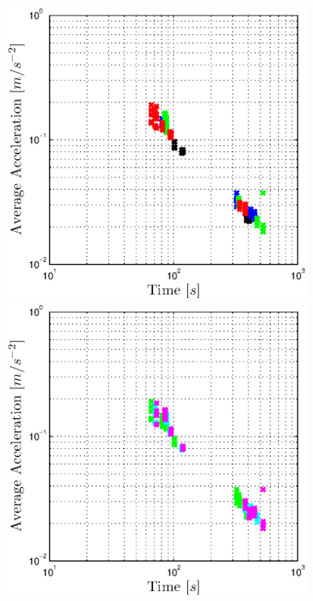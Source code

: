 \begin{figure}[H]
  \begin{minipage}[t]{0.48\textwidth}
    \includegraphics[width = \textwidth]{correlation/Control_Correlation_Time_Acc_Parametrization}
  \end{minipage}
  \hfill
  \begin{minipage}[t]{0.48\textwidth}
    \includegraphics[width = \textwidth]{correlation/Control_Correlation_Time_Acc_SplineDegree}

\end{minipage}
\end{figure}
